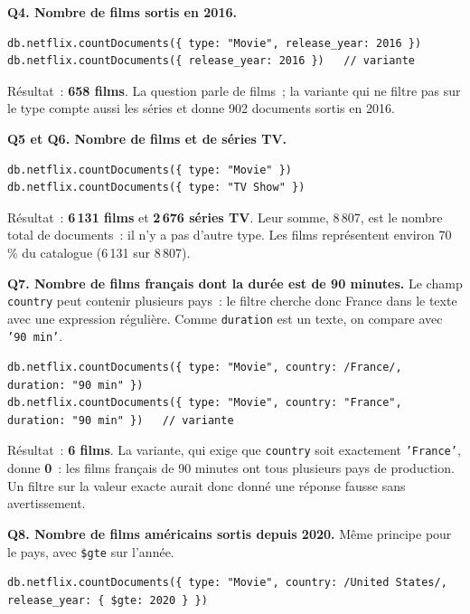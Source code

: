 \noindent \textbf{Q4. Nombre de films sortis en 2016.}

\begin{verbatim}
db.netflix.countDocuments({ type: "Movie", release_year: 2016 })
db.netflix.countDocuments({ release_year: 2016 })   // variante
\end{verbatim}

\noindent Résultat~: \textbf{658 films}. La question parle de films~; la variante qui ne filtre pas sur le type compte aussi les séries et donne 902 documents sortis en 2016.

\medskip
{}
\noindent \textbf{Q5 et Q6. Nombre de films et de séries TV.}

\begin{verbatim}
db.netflix.countDocuments({ type: "Movie" })
db.netflix.countDocuments({ type: "TV Show" })
\end{verbatim}

\noindent Résultat~: \textbf{6\,131 films} et \textbf{2\,676 séries TV}. Leur somme, 8\,807, est le nombre total de documents~: il n'y a pas d'autre type. Les films représentent environ 70\,\% du catalogue (6\,131 sur 8\,807).

\medskip
{}
\noindent \textbf{Q7. Nombre de films français dont la durée est de 90 minutes.} Le champ \texttt{country} peut contenir plusieurs pays~: le filtre cherche donc \og France \fg{} dans le texte avec une expression régulière. Comme \texttt{duration} est un texte, on compare avec \texttt{'90 min'}.

\begin{verbatim}
db.netflix.countDocuments({ type: "Movie", country: /France/, duration: "90 min" })
db.netflix.countDocuments({ type: "Movie", country: "France", duration: "90 min" })   // variante
\end{verbatim}

\noindent Résultat~: \textbf{6 films}. La variante, qui exige que \texttt{country} soit exactement \texttt{'France'}, donne \textbf{0}~: les films français de 90 minutes ont tous plusieurs pays de production. Un filtre sur la valeur exacte aurait donc donné une réponse fausse sans avertissement.

\medskip
{}
\noindent \textbf{Q8. Nombre de films américains sortis depuis 2020.} Même principe pour le pays, avec \texttt{\$gte} sur l'année.

\begin{verbatim}
db.netflix.countDocuments({ type: "Movie", country: /United States/, release_year: { $gte: 2020 } })
\end{verbatim}

